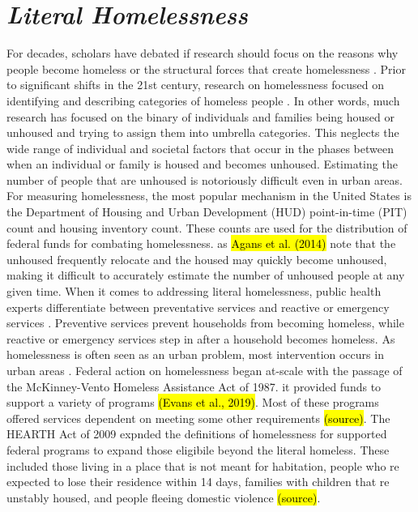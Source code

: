 \section{\textit{Literal Homelessness}}
For decades, scholars have debated if research should focus on the reasons why people become homeless or the structural forces that create homelessness \citep{shlay_social_2003}. Prior to significant shifts in the 21st century, research on homelessness focused on identifying and describing categories of homeless people \citep{lee_homelessness_2021}. In other words, much research has focused on the binary of individuals and families being housed or unhoused and trying to assign them into umbrella categories. This neglects the wide range of individual and societal factors that occur in the phases between when an individual or family is housed and becomes unhoused. Estimating the number of people that are unhoused is notoriously difficult even in urban areas. For measuring homelessness, the most popular mechanism in the United States is the Department of Housing and Urban Development (HUD) point-in-time (PIT) count and housing inventory count. These counts are used for the distribution of federal funds for combating homelessness. as \hl{Agans et al. (2014)} note that the unhoused frequently relocate and the housed may quickly become unhoused, making it difficult to accurately estimate the number of unhoused people at any given time. When it comes to addressing literal homelessness, public health experts differentiate between preventative services and reactive or emergency services \citep{oregan_how_2021}. Preventive services prevent households from becoming homeless, while reactive or emergency services step in after a household becomes homeless. As homelessness is often seen as an urban problem, most intervention occurs in urban areas \citep{gleason_using_2021}. Federal action on homelessness began at-scale with the passage of the McKinney-Vento Homeless Assistance Act of 1987. it provided funds to support a variety of programs \hl{(Evans et al., 2019)}. Most of these programs offered services dependent on meeting some other requirements \hl{(source)}. The HEARTH Act of 2009 expnded the definitions of homelessness for supported federal programs to expand those eligibile beyond the literal homeless. These included those living in a place that is not meant for habitation, people who re expected to lose their residence within 14 days, families with children that re unstably housed, and people fleeing domestic violence \hl{(source)}. 

